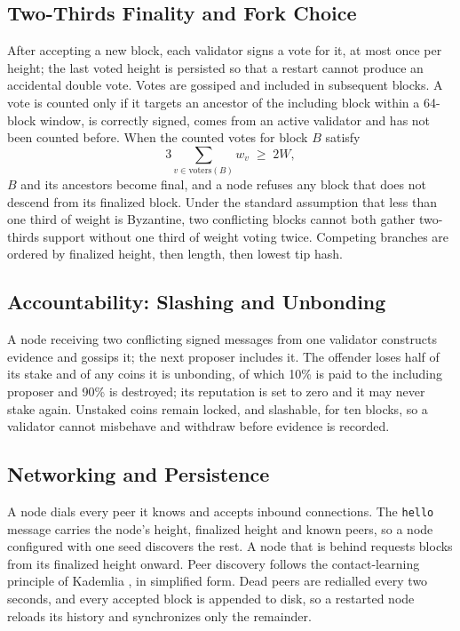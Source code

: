\documentclass[conference]{IEEEtran}
\begin{document}
\subsection{Two-Thirds Finality and Fork Choice}
After accepting a new block, each validator signs a vote for it, at most once per height; the last voted height is persisted so that a restart cannot produce an accidental double vote. Votes are gossiped and included in subsequent blocks. A vote is counted only if it targets an ancestor of the including block within a 64-block window, is correctly signed, comes from an active validator and has not been counted before. When the counted votes for block $B$ satisfy
\begin{equation}
3 \textstyle\sum_{v \in \mathrm{voters}(B)} w_v \;\geq\; 2W,
\end{equation}
$B$ and its ancestors become final, and a node refuses any block that does not descend from its finalized block. Under the standard assumption that less than one third of weight is Byzantine, two conflicting blocks cannot both gather two-thirds support without one third of weight voting twice. Competing branches are ordered by finalized height, then length, then lowest tip hash.

\subsection{Accountability: Slashing and Unbonding}\label{sec:slash}
A node receiving two conflicting signed messages from one validator constructs evidence and gossips it; the next proposer includes it. The offender loses half of its stake and of any coins it is unbonding, of which 10\% is paid to the including proposer and 90\% is destroyed; its reputation is set to zero and it may never stake again. Unstaked coins remain locked, and slashable, for ten blocks, so a validator cannot misbehave and withdraw before evidence is recorded.

\subsection{Networking and Persistence}
A node dials every peer it knows and accepts inbound connections. The \texttt{hello} message carries the node's height, finalized height and known peers, so a node configured with one seed discovers the rest. A node that is behind requests blocks from its finalized height onward. Peer discovery follows the contact-learning principle of Kademlia \cite{maymounkov2002}, in simplified form. Dead peers are redialled every two seconds, and every accepted block is appended to disk, so a restarted node reloads its history and synchronizes only the remainder.
\end{document}
